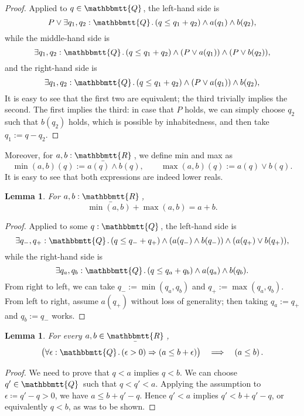 \documentclass[11pt, oneside, article]{memoir}
\theoremstyle{plain}
\newtheorem{lemma}[theorem]{Lemma}
\theoremstyle{definition}
\theoremstyle{remark}
\newcommand{\ubar}[1]{\underaccent{\bar}{#1}}
\newcommand{\internal}[1]{\raisebox{-.03ex}{$\mathbbmtt{#1}$}}
\newcommand{\hs}{\hspace{1.1pt}}
\newcommand{\tQQ}{\internal{Q}\hs}
\newcommand{\tRR}{\internal{R}\hs}
\newcommand{\tLR}{\ubar{\tRR}\hs}
\newcommand{\imp}{\Rightarrow}
\begin{document}
\begin{proof}
	Applied to $q \in \tQQ$, the left-hand side is
	\[
		P \lor \exists q_1, q_2  : \tQQ \ldotp (q \leq q_1 + q_2) \land a(q_1) \land b(q_2),
	\]
	while the middle-hand side is
	\[
		\exists q_1, q_2  : \tQQ \ldotp (q \leq q_1 + q_2) \land (P \lor a(q_1)) \land (P \lor b(q_2)),
	\]
	and the right-hand side is
	\[
		\exists q_1, q_2  : \tQQ \ldotp (q \leq q_1 + q_2) \land (P \lor a(q_1)) \land b(q_2),
	\]
	It is easy to see that the first two are equivalent; the third trivially implies the second. The first implies the third: in case that $P$ holds, we can simply choose $q_2$ such that $b(q_2)$ holds, which is possible by inhabitedness, and then take $q_1 := q - q_2$.
\end{proof}

Moreover, for $a,b : \tLR$, we define min and max as
\[
	\min(a,b)(q) := a(q) \land b(q),\qquad	\max(a,b)(q) := a(q) \lor b(q).
\]
It is easy to see that both expressions are indeed lower reals.

\begin{lemma}
	\label{lem.max_min_LR}
	For $a,b : \tLR$,
	\[
		\min(a,b) + \max(a,b) = a + b.
	\]
\end{lemma}

\begin{proof}
	Applied to some $q : \tQQ$, the left-hand side is 	
	\[
			\exists q_-, q_+  : \tQQ \ldotp (q \leq q_- + q_+) \land (a(q_-) \land b(q_-)) \land (a(q_+) \lor b(q_+)),
	\]
	while the right-hand side is
	\[
			\exists q_a, q_b  : \tQQ \ldotp (q \leq q_a + q_b) \land a(q_a) \land b(q_b).
	\]
	From right to left, we can take $q_- := \min(q_a,q_b)$ and $q_+ := \max(q_a,q_b)$. From left to right, assume $a(q_+)$ without loss of generality; then taking $q_a := q_+$ and $q_b := q_-$ works.
\end{proof}

\begin{lemma}
	\label{lem:eps_order}
	For every $a,b\in\tLR$,
	\[
		\big(\forall \epsilon : \tQQ\ldotp (\epsilon > 0) \imp (a \leq b + \epsilon)\big) \quad \Longrightarrow \quad \left( a \leq b \right).
	\]
\end{lemma}

\begin{proof}
	We need to prove that $q < a$ implies $q < b$. We can choose $q' \in \tQQ$ such that $q < q' < a$. Applying the assumption to $\epsilon\coloneqq q' - q > 0$, we have $a \le b + q' - q$. Hence $q' < a$ implies $q' < b + q' - q$, or equivalently $q < b$, as was to be shown.
\end{proof}
\end{document}
